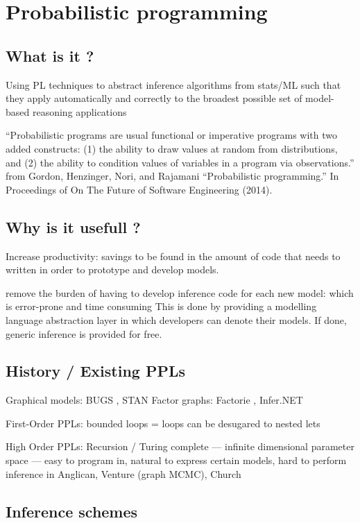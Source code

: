 \section{Probabilistic programming}

\subsection{What is it ?} \label{PPL_def}
Using PL techniques to abstract inference algorithms from stats/ML such that they apply automatically and correctly to the broadest possible set of model-based reasoning applications

“Probabilistic programs are usual functional or imperative programs with two added constructs: 
(1) the ability to draw values at random from distributions, and 
(2) the ability to condition values of variables in a program via observations.”  
from  Gordon, Henzinger, Nori, and Rajamani “Probabilistic programming.” In Proceedings of On The Future of Software Engineering (2014).

\subsection{Why is it usefull ?}
Increase productivity: savings to be found in the amount of code that needs to written in order to prototype and develop models.

remove the burden of having to develop inference code for each new model: which is error-prone and time consuming
This is done by providing a modelling language abstraction layer in which developers can denote their models.  If done, generic inference is provided for free.

\subsection{History / Existing PPLs}
Graphical models: BUGS \cite{Bugs}, STAN \cite{Stan}
Factor graphs: Factorie \cite{Factorie}, Infer.NET \cite{InferNET}

First-Order PPLs: bounded loops = loops can be desugared to nested lets

High Order PPLs: Recursion / Turing complete — infinite dimensional parameter space — easy to program in, natural to express certain models, hard to perform inference in
Anglican, Venture (graph MCMC), Church

\subsection{Inference schemes}

